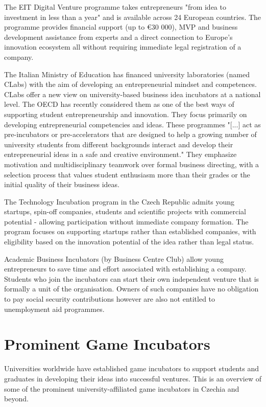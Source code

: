 The EIT Digital Venture programme takes entrepreneurs "from idea to investment in less than a year" and is available across 24 European countries. The programme provides financial support (up to €30 000), MVP and business development assistance from experts and a direct connection to Europe's innovation ecosystem all without requiring immediate legal registration of a company.

The Italian Ministry of Education has financed university laboratories (named CLabs) with the aim of developing an entrepreneurial mindset and competences. CLabs offer a new view on university-based business idea incubators at a national level. The OECD has recently considered them as one of the best ways of supporting student entrepreneurship and innovation. They focus primarily on developing entrepreneurial competencies and ideas. These programmes "[...] act as pre-incubators or pre-accelerators that are designed to help a growing number of university students from different backgrounds interact and develop their entrepreneurial ideas in a safe and creative environment." They emphasize motivation and multidisciplinary teamwork over formal business directing, with a selection process that values student enthusiasm more than their grades or the initial quality of their business ideas.

The Technology Incubation program in the Czech Republic admits young startups, spin-off companies, students and scientific projects with commercial potential - allowing participation without immediate company formation. The program focuses on supporting startups rather than established companies, with eligibility based on the innovation potential of the idea rather than legal status.

Academic Business Incubators (by Business Centre Club) allow young entrepreneurs to save time and effort associated with establishing a company. Students who join the incubators can start their own independent venture that is formally a unit of the organisation. Owners of such companies have no obligation to pay social security contributions however are also not entitled to unemployment aid programmes.

\section{Prominent Game Incubators}
Universities worldwide have established game incubators to support students and graduates in developing their ideas into successful ventures. This is an overview of some of the prominent university-affiliated game incubators in Czechia and beyond.

